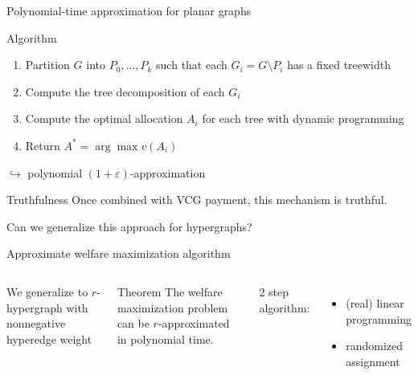 \documentclass[aspectratio=169]{beamer}
\begin{document}
\begin{frame}{Polynomial-time approximation for planar graphs}
    \begin{block}{Algorithm}
        \begin{enumerate}
            \item \alert{Partition} $G$ into $P_0, \dots, P_k$ such that each $G_i = G \setminus P_i$ has a \alert{fixed treewidth}
            \item Compute the \alert{tree decomposition} of each $G_i$
            \item Compute the optimal allocation $A_i$ for each tree with \alert{dynamic programming}
            \item Return $A^* = \arg \max v(A_i)$
        \end{enumerate}
    \end{block}

    $\hookrightarrow$ polynomial $(1 + \varepsilon)$-approximation

    \begin{block}{Truthfulness}
        Once combined with \alert{VCG payment}, this mechanism is \alert{truthful}.
    \end{block}
\end{frame}

\begin{frame}[standout]
    Can we generalize this approach for \alert{hypergraphs}?
\end{frame}

\begin{frame}{Approximate welfare maximization algorithm}
    \begin{columns}
        We generalize to $r$-hypergraph with \alert{nonnegative hyperedge weight}

        \begin{block}{Theorem}
            The welfare maximization problem can be \(r\)-approximated in polynomial time.
        \end{block}

        2 step algorithm:
        \begin{itemize}
            \item (real) linear programming
            \item randomized assignment
        \end{itemize}
    \end{columns}
\end{frame}
\end{document}
